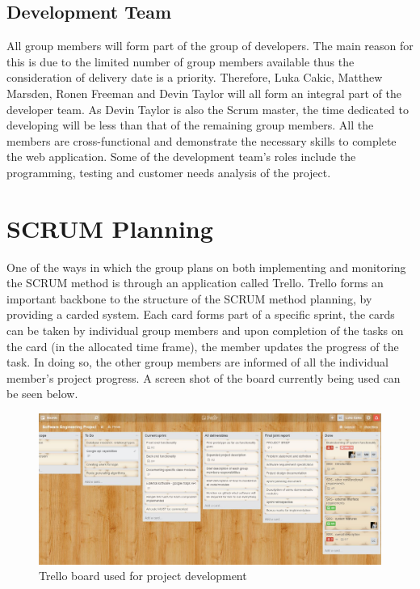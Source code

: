 \documentclass[10pt, a4paper, onecolumn]{scrartcl}
\begin{document}
		\subsection{Development Team}
		
			All group members will form part of the group of developers. The main reason for this is due to the limited number of group members available thus the consideration of delivery date is a priority. Therefore, Luka Cakic, Matthew Marsden, Ronen Freeman and Devin Taylor will all form an integral part of the developer team. As Devin Taylor is also the Scrum master, the time dedicated to developing will be less than that of the remaining group members. All the members are cross-functional and demonstrate the necessary skills to complete the web application. Some of the development team's roles include the programming, testing and customer needs analysis of the project. 
	
	\section{SCRUM Planning}
	
		One of the ways in which the group plans on both implementing and monitoring the SCRUM method is through an application called Trello. Trello forms an important backbone to the structure of the SCRUM method planning, by providing a carded system. Each card forms part of a specific sprint, the cards can be taken by individual group members and upon completion of the tasks on the card (in the allocated time frame), the member updates the progress of the task. In doing so, the other group members are informed of all the individual member's project progress. A screen shot of the board currently being used can be seen below. 
		
		\begin{figure}[h!]
			\centering
			\includegraphics[scale = 0.4]{../images/Trello.JPG}
			\caption{Trello board used for project development}
			\label{menu}
		\end{figure}
		
\end{document}
